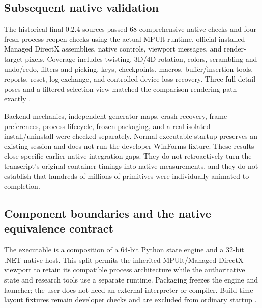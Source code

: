 \documentclass[a4paper,11pt]{article}
\begin{document}
\subsection{Subsequent native validation}

The historical final 0.2.4 sources passed 68 comprehensive native checks and four fresh-process reopen checks using the actual MPUlt runtime, official installed Managed DirectX assemblies, native controls, viewport messages, and render-target pixels. Coverage includes twisting, 3D/4D rotation, colors, scrambling and undo/redo, filters and picking, keys, checkpoints, macros, buffer/insertion tools, reports, reset, log exchange, and controlled device-loss recovery. Three full-detail poses and a filtered selection view matched the comparison rendering path exactly \cite{validation}.

Backend mechanics, independent generator maps, crash recovery, frame preferences, process lifecycle, frozen packaging, and a real isolated install/uninstall were checked separately. Normal executable startup preserves an existing session and does not run the developer WinForms fixture. These results close specific earlier native integration gaps. They do not retroactively turn the transcript's original container timings into native measurements, and they do not establish that hundreds of millions of primitives were individually animated to completion.

\subsection{Component boundaries and the native equivalence contract}

The executable is a composition of a 64-bit Python state engine and a 32-bit .NET native host. This split permits the inherited MPUlt/Managed DirectX viewport to retain its compatible process architecture while the authoritative state and research tools use a separate runtime. Packaging freezes the engine and launcher; the user does not need an external interpreter or compiler. Build-time layout fixtures remain developer checks and are excluded from ordinary startup \cite{sourcecode,validation}.
\end{document}
